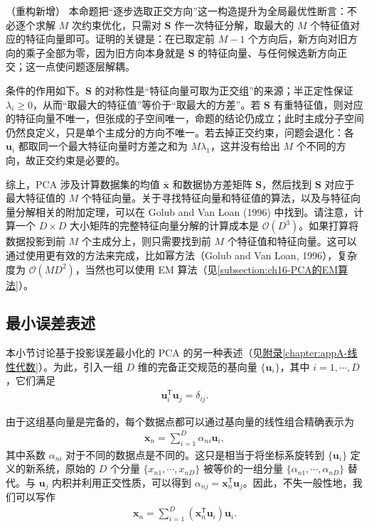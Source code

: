 \documentclass[../../main.tex]{subfiles}
\begin{document}
\begin{remark}（重构新增）
本命题把“逐步选取正交方向”这一构造提升为全局最优性断言：不必逐个求解 $M$ 次约束优化，只需对 $\bm{S}$ 作一次特征分解，取最大的 $M$ 个特征值对应的特征向量即可。证明的关键是：在已取定前 $M-1$ 个方向后，新方向对旧方向的乘子全部为零，因为旧方向本身就是 $\bm{S}$ 的特征向量、与任何候选新方向正交；这一点使问题逐层解耦。

条件的作用如下。$\bm{S}$ 的对称性是“特征向量可取为正交组”的来源；半正定性保证 $\lambda_i\geqslant0$，从而“取最大的特征值”等价于“取最大的方差”。若 $\bm{S}$ 有重特征值，则对应的特征向量不唯一，但张成的子空间唯一，命题的结论仍成立；此时主成分子空间仍然良定义，只是单个主成分的方向不唯一。若去掉正交约束，问题会退化：各 $\bm{u}_i$ 都取同一个最大特征向量时方差之和为 $M\lambda_1$，这并没有给出 $M$ 个不同的方向，故正交约束是必要的。
\end{remark}

综上，PCA 涉及计算数据集的均值 $\bar{\bm{x}}$ 和数据协方差矩阵 $\bm{S}$，然后找到 $\bm{S}$ 对应于最大特征值的 $M$ 个特征向量。关于寻找特征向量和特征值的算法，以及与特征向量分解相关的附加定理，可以在 Golub and Van Loan (1996) 中找到。请注意，计算一个 $D\times D$ 大小矩阵的完整特征向量分解的计算成本是 $\mathcal{O}(D^3)$。如果打算将数据投影到前 $M$ 个主成分上，则只需要找到前 $M$ 个特征值和特征向量。这可以通过使用更有效的方法来完成，比如幂方法（Golub and Van Loan, 1996），复杂度为 $\mathcal{O}(MD^2)$，当然也可以使用 EM 算法（见\cref{subsection:ch16-PCA的EM算法}）。

\subsection{最小误差表述}\label{subsection:ch16-最小误差表述}

本小节讨论基于投影误差最小化的 PCA 的另一种表述（见\hyperref[chapter:appA-线性代数]{附录\ref*{chapter:appA-线性代数}}）。为此，引入一组 $D$ 维的完备正交规范的基向量 $\{\bm{u}_i\}$，其中 $i=1,\cdots,D$，它们满足
\begin{align}
  \bm{u}_i^{\mathsf T}\bm{u}_j=\delta_{ij}.
  \label{align:ch16-正交基}
\end{align}

由于这组基向量是完备的，每个数据点都可以通过基向量的线性组合精确表示为
\begin{align}
  \bm{x}_n=\sum_{i=1}^{D}\alpha_{ni}\bm{u}_i,
  \label{align:ch16-基展开}
\end{align}
其中系数 $\alpha_{ni}$ 对于不同的数据点是不同的。这只是相当于将坐标系旋转到 $\{\bm{u}_i\}$ 定义的新系统，原始的 $D$ 个分量 $\{x_{n1},\cdots,x_{nD}\}$ 被等价的一组分量 $\{\alpha_{n1},\cdots,\alpha_{nD}\}$ 替代。与 $\bm{u}_j$ 内积并利用正交性质，可以得到 $\alpha_{nj}=\bm{x}_n^{\mathsf T}\bm{u}_j$。因此，不失一般性地，我们可以写作
\begin{align}
  \bm{x}_n=\sum_{i=1}^{D}\left(\bm{x}_n^{\mathsf T}\bm{u}_i\right)\bm{u}_i.
  \label{align:ch16-系数}
\end{align}
\end{document}
